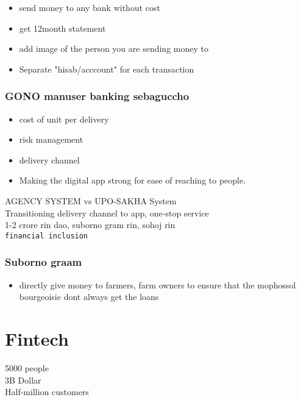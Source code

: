 \documentclass[11pt]{article}
\begin{document}
\begin{itemize}
\item send money to any bank without cost\\
\item get 12month statement\\
\item add image of the person you are sending money to\\
\item Separate "hisab/acccount" for each transaction\\
\end{itemize}
\subsubsection{GONO manuser banking sebaguccho}
\label{sec:orgdfa8478}
\begin{itemize}
\item cost of unit per delivery\\
\item risk management\\
\item delivery channel\\
\item Making the digital app strong for ease of reaching to people.\\
\end{itemize}

AGENCY SYSTEM vs UPO-SAKHA System\\

Transitioning delivery channel to app, one-stop service\\

1-2 crore rin dao, suborno gram rin, sohoj rin\\

\texttt{financial inclusion}\\
\subsubsection{Suborno graam}
\label{sec:org7789221}
\begin{itemize}
\item directly give money to farmers, farm owners to ensure that the mophossol bourgeoisie dont always get the loans\\
\end{itemize}
\section{Fintech}
\label{sec:org53fda4c}
5000 people\\
3B Dollar\\
Half-million customers\\
\end{document}
